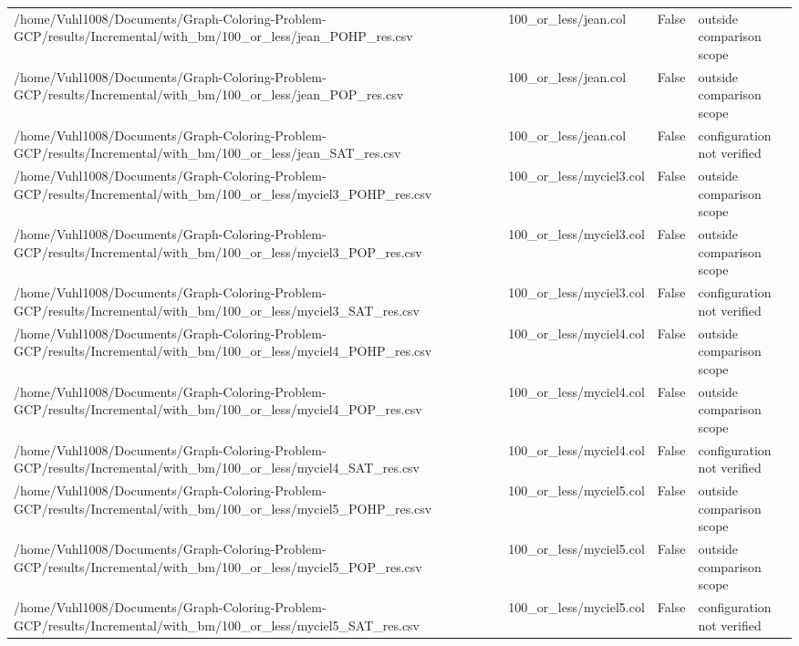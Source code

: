\begin{table}[htbp]
\begin{tabular}{llll}
/home/Vuhl1008/Documents/Graph-Coloring-Problem-GCP/results/Incremental/with\_bm/100\_or\_less/jean\_POHP\_res.csv & 100\_or\_less/jean.col & False & outside comparison scope \\
/home/Vuhl1008/Documents/Graph-Coloring-Problem-GCP/results/Incremental/with\_bm/100\_or\_less/jean\_POP\_res.csv & 100\_or\_less/jean.col & False & outside comparison scope \\
/home/Vuhl1008/Documents/Graph-Coloring-Problem-GCP/results/Incremental/with\_bm/100\_or\_less/jean\_SAT\_res.csv & 100\_or\_less/jean.col & False & configuration not verified \\
/home/Vuhl1008/Documents/Graph-Coloring-Problem-GCP/results/Incremental/with\_bm/100\_or\_less/myciel3\_POHP\_res.csv & 100\_or\_less/myciel3.col & False & outside comparison scope \\
/home/Vuhl1008/Documents/Graph-Coloring-Problem-GCP/results/Incremental/with\_bm/100\_or\_less/myciel3\_POP\_res.csv & 100\_or\_less/myciel3.col & False & outside comparison scope \\
/home/Vuhl1008/Documents/Graph-Coloring-Problem-GCP/results/Incremental/with\_bm/100\_or\_less/myciel3\_SAT\_res.csv & 100\_or\_less/myciel3.col & False & configuration not verified \\
/home/Vuhl1008/Documents/Graph-Coloring-Problem-GCP/results/Incremental/with\_bm/100\_or\_less/myciel4\_POHP\_res.csv & 100\_or\_less/myciel4.col & False & outside comparison scope \\
/home/Vuhl1008/Documents/Graph-Coloring-Problem-GCP/results/Incremental/with\_bm/100\_or\_less/myciel4\_POP\_res.csv & 100\_or\_less/myciel4.col & False & outside comparison scope \\
/home/Vuhl1008/Documents/Graph-Coloring-Problem-GCP/results/Incremental/with\_bm/100\_or\_less/myciel4\_SAT\_res.csv & 100\_or\_less/myciel4.col & False & configuration not verified \\
/home/Vuhl1008/Documents/Graph-Coloring-Problem-GCP/results/Incremental/with\_bm/100\_or\_less/myciel5\_POHP\_res.csv & 100\_or\_less/myciel5.col & False & outside comparison scope \\
/home/Vuhl1008/Documents/Graph-Coloring-Problem-GCP/results/Incremental/with\_bm/100\_or\_less/myciel5\_POP\_res.csv & 100\_or\_less/myciel5.col & False & outside comparison scope \\
/home/Vuhl1008/Documents/Graph-Coloring-Problem-GCP/results/Incremental/with\_bm/100\_or\_less/myciel5\_SAT\_res.csv & 100\_or\_less/myciel5.col & False & configuration not verified \\

\end{tabular}
\end{table}

